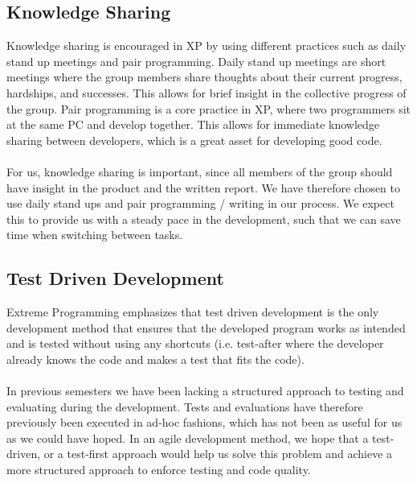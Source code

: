 \subsection{Knowledge Sharing}
\label{sub:knowledge_sharing}
Knowledge sharing is encouraged in XP by using different practices such as daily stand up meetings and pair programming. Daily stand up meetings are short meetings where the group members share thoughts about their current progress, hardships, and successes. This allows for brief insight in the collective progress of the group. Pair programming is a core practice in XP, where two programmers sit at the same PC and develop together. This allows for immediate knowledge sharing between developers, which is a great asset for developing good code.
\\\\ 
For us, knowledge sharing is important, since all members of the group should have insight in the product and the written report. We have therefore chosen to use daily stand ups and pair programming / writing in our process. We expect this to provide us with a steady pace in the development, such that we can save time when switching between tasks. 

\subsection{Test Driven Development}
\label{sub:test_driven_development}
Extreme Programming emphasizes that test driven development is the only development method that ensures that the developed program works as intended and is tested without using any shortcuts (i.e. test-after where the developer already knows the code and makes a test that fits the code). 
\\\\
In previous semesters we have been lacking a structured approach to testing and evaluating during the development. Tests and evaluations have therefore previously been executed in ad-hoc fashions, which has not been as useful for us as we could have hoped. In an agile development method, we hope that a test-driven, or a test-first approach would help us solve this problem and achieve a more structured approach to enforce testing and code quality.


